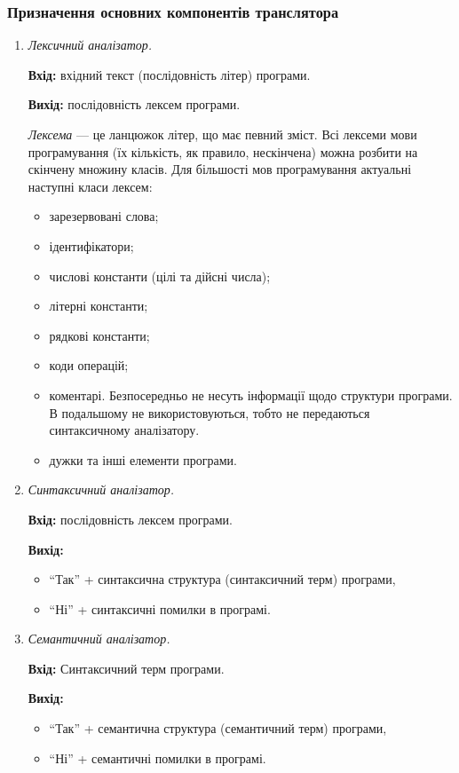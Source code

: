 \subsubsection{Призначення основних компонентів транслятора}

\begin{enumerate}
	\item \textit{Лексичний аналізатор.} \medskip
	
	\textbf{Вхід:} вхідний текст (послідовність літер) програми. \medskip

	\textbf{Вихід:} послідовність лексем програми. \medskip

	\textit{Лексема} --- це ланцюжок літер, що має певний зміст. Всі лексеми мови
	програмування (їх кількість, як правило, нескінчена) можна розбити на скінчену
	множину класів. Для більшості мов програмування актуальні наступні класи
	лексем:
	\begin{itemize}
		\item зарезервовані слова;
		\item ідентифікатори;
		\item числові константи (цілі та дійсні числа);
		\item літерні константи;
		\item рядкові константи;
		\item коди операцій;
		\item коментарі. Безпосередньо не несуть інформації щодо структури
		програми. В подальшому не використовуються, тобто не передаються
		синтаксичному аналізатору.
		\item дужки та інші елементи програми.
	\end{itemize}

	\item \textit{Синтаксичний аналізатор.} \medskip

	\textbf{Вхід:} послідовність лексем програми. \medskip
	
	\textbf{Вихід:}
	\begin{itemize}
		\item ``Так'' + синтаксична структура (синтаксичний терм) програми,
		\item ``Ні'' + синтаксичні помилки в програмі.
	\end{itemize}

	\item \textit{Семантичний аналізатор.} \medskip

	\textbf{Вхід:} Синтаксичний терм програми. \medskip

	\textbf{Вихід:} \medskip
	\begin{itemize}
		\item ``Так'' + семантична структура (семантичний терм) програми,
		\item ``Ні'' + семантичні помилки в програмі.
	\end{itemize}


\end{enumerate}
